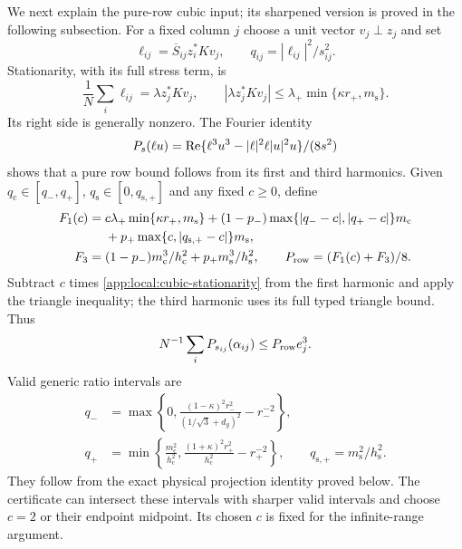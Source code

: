 We next explain the pure-row cubic input; its sharpened version is
proved in the following subsection. For a fixed column $j$ choose a
unit vector $v_j\perp z_j$ and set
\[
 \ell_{ij}=\overline S_{ij}z_i^*Kv_j,\qquad
 q_{ij}=|\ell_{ij}|^2/s_{ij}^2 .
\]
Stationarity, with its full stress term, is
\begin{equation}\label{app:local:cubic-stationarity}
 \frac1N\sum_i\ell_{ij}=\lambda z_j^*Kv_j,\qquad
 |\lambda z_j^*Kv_j|\le\lambda_+\min\{\kappa r_+,m_{\mathrm s}\}.
\end{equation}
Its right side is generally nonzero. The Fourier identity
\[
 P_s(\ell u)=
 \operatorname{Re}\{\ell^3u^3-|\ell|^2\ell|u|^2u\}/(8s^2)
\]
shows that a pure row bound follows from its first and third harmonics.
Given $q_{\mathrm c}\in[q_-,q_+]$, $q_{\mathrm s}\in[0,q_{\mathrm s,+}]$
and any fixed $c\ge0$, define
\begin{align}
 F_1(c)={}&c\lambda_+\min\{\kappa r_+,m_{\mathrm s}\}
 +(1-p_-)\max\{|q_--c|,|q_+-c|\}m_{\mathrm c}\nonumber\\
 &+p_+\max\{c,|q_{\mathrm s,+}-c|\}m_{\mathrm s},\nonumber\\
 F_3={}&(1-p_-)m_{\mathrm c}^3/h_{\mathrm c}^2
                  +p_+m_{\mathrm s}^3/h_{\mathrm s}^2,\qquad
 P_{\rm row}=(F_1(c)+F_3)/8 .\label{app:local:generic-cubic-row}
\end{align}
Subtract $c$ times \eqref{app:local:cubic-stationarity} from the first
harmonic and apply the triangle inequality; the third harmonic uses
its full typed triangle bound. Thus
\begin{equation}\label{app:local:pure-row}
 N^{-1}\sum_iP_{s_{ij}}(\alpha_{ij})\le P_{\rm row}e_j^3.
\end{equation}
Valid generic ratio intervals are
\begin{align*}
 q_-&=\max\left\{0,\frac{(1-\kappa)^2r_-^2}{(1/\sqrt3+d_g)^2}
                              -r_-^{-2}\right\},\\
 q_+&=\min\left\{\frac{m_{\mathrm c}^2}{h_{\mathrm c}^2},
       \frac{(1+\kappa)^2r_+^2}{h_{\mathrm c}^2}-r_+^{-2}\right\},
 \qquad q_{\mathrm s,+}=m_{\mathrm s}^2/h_{\mathrm s}^2 .
\end{align*}
They follow from the exact physical projection identity proved below.
The certificate can intersect these intervals with sharper valid
intervals and choose $c=2$ or their endpoint midpoint. Its chosen $c$
is fixed for the infinite-range argument.

